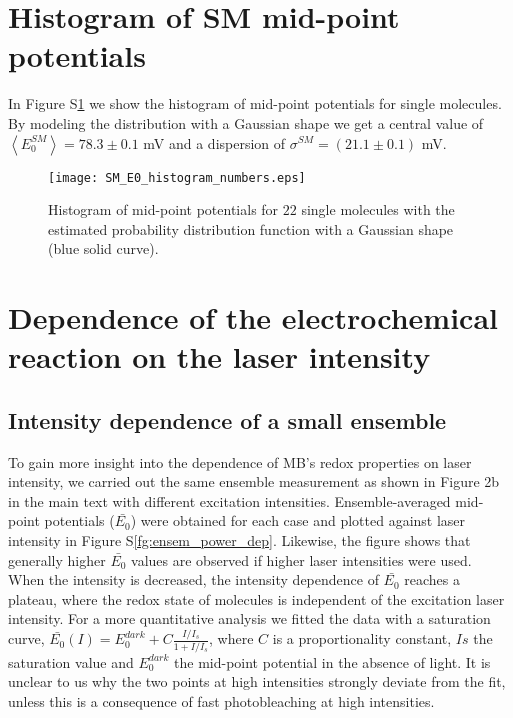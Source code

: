 \documentclass[11pt,a4paper,onecolumn]{article}
\begin{document}
\section{Histogram of SM mid-point potentials}

In Figure S\ref{fg:E0_histogram} we show the histogram of mid-point potentials for single molecules. By modeling the distribution with a Gaussian shape we get a central value of $\left<E_0^{SM}\right>=78.3 \pm 0.1$ mV and a dispersion of $\sigma^{SM}=(21.1 \pm 0.1)$ mV.

\begin{figure}
  \centering
  \texttt{[image: SM\_E0\_histogram\_numbers.eps]}
	\makeatletter
	\renewcommand{\fnum@figure}{\figurename~S\thefigure}
	\makeatother
  \caption{Histogram of mid-point potentials for $22$ single molecules with the estimated probability distribution function with a Gaussian shape (blue solid curve).
	}
  \label{fg:E0_histogram}
\end{figure}


\section{Dependence of the electrochemical reaction on the laser intensity}


\subsection{Intensity dependence of a small ensemble} 
To gain more insight into the dependence of MB's redox properties on laser intensity, we carried out the same ensemble measurement as shown in Figure 2b in the main text with different excitation intensities. 
Ensemble-averaged mid-point potentials ($\bar{E_0}$) were obtained for each case and plotted against laser intensity in Figure S\ref{fg:ensem_power_dep}. 
Likewise, the figure shows that generally higher $\bar{E_0}$ values are observed if higher laser intensities were used. When the intensity is decreased, %
the intensity dependence of $\bar{E_0}$ reaches a plateau, where the redox state of molecules is independent of the excitation laser intensity. 
For a more quantitative analysis we fitted the data with a saturation curve, $\bar{E_0}(I) = E_0^{dark}+C\frac{I/I_s}{1+I/I_s}$, where $C$ is a proportionality constant, $Is$ the saturation value and $E_0^{dark}$ the mid-point potential in the absence of light. It is unclear to us why the two points at high intensities strongly deviate from the fit, unless this is a consequence of fast photobleaching at high intensities.  
\end{document}
